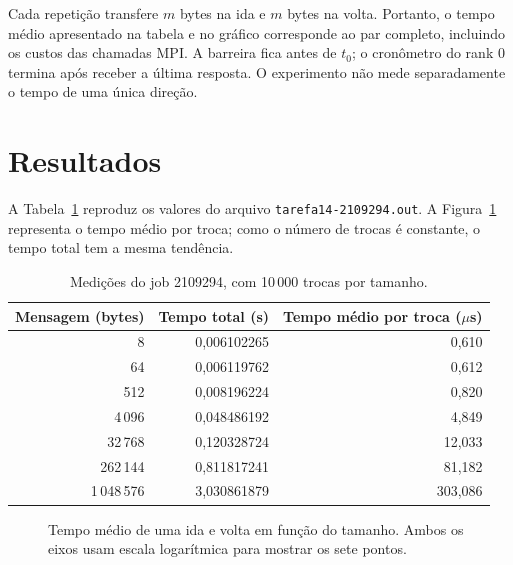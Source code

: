 \documentclass[11pt,letterpaper]{article}
\begin{document}
Cada repetição transfere $m$ bytes na ida e $m$ bytes na volta. Portanto, o tempo médio apresentado na tabela e no gráfico corresponde ao par completo, incluindo os custos das chamadas MPI. A barreira fica antes de $t_0$; o cronômetro do rank 0 termina após receber a última resposta. O experimento não mede separadamente o tempo de uma única direção.

\section{Resultados}
A Tabela~\ref{tab:tempos} reproduz os valores do arquivo \texttt{tarefa14-2109294.out}. A Figura~\ref{fig:tempo} representa o tempo médio por troca; como o número de trocas é constante, o tempo total tem a mesma tendência.

\begin{table}[H]
\centering
\begin{tabular}{rrr}
\toprule
Mensagem (bytes) & Tempo total (s) & Tempo médio por troca ($\mu$s) \\
\midrule
8       & 0,006102265 & 0,610 \\
64      & 0,006119762 & 0,612 \\
512     & 0,008196224 & 0,820 \\
4\,096  & 0,048486192 & 4,849 \\
32\,768 & 0,120328724 & 12,033 \\
262\,144 & 0,811817241 & 81,182 \\
1\,048\,576 & 3,030861879 & 303,086 \\
\bottomrule
\end{tabular}
\caption{Medições do job 2109294, com 10\,000 trocas por tamanho.}
\label{tab:tempos}
\end{table}

\begin{figure}[H]
\centering
{}
\caption{Tempo médio de uma ida e volta em função do tamanho. Ambos os eixos usam escala logarítmica para mostrar os sete pontos.}
\label{fig:tempo}
\end{figure}
\end{document}
